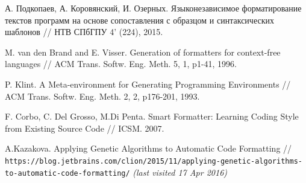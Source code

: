 \documentclass[conference]{IEEEtran}
\begin{document}
\begin{thebibliography}{4}


  А. Подкопаев, А. Коровянский, И. Озерных.
  Языконезависимое форматирование текстов программ
  на основе сопоставления с образцом и синтаксических шаблонов
  // НТВ СПбГПУ 4' (224), 2015.

  
  
 M. van den Brand and E. Visser.
Generation of formatters for context-free languages //
ACM Trans. Softw. Eng. Meth. 5, 1, p1-41, 1996.

 P. Klint. A Meta-environment for Generating Programming Environments //
ACM Trans. Softw. Eng. Meth. 2, 2, p176-201, 1993.

 F. Corbo, C. Del Grosso, M.Di Penta.
Smart Formatter: Learning Coding Style from Existing Source Code //
ICSM. 2007.

 A.Kazakova.
Applying Genetic Algorithms to Automatic Code Formatting
// \texttt{https://blog.jetbrains.com/clion/2015/11/applying-genetic-algorithms-to-automatic-code-formatting/}
\emph{(last visited 17 Apr 2016)}
\end{thebibliography}
\end{document}
